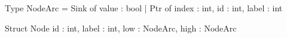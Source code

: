 \begin{blstlisting}[language=pseudo, numbers=none]
  Type NodeArc = Sink of { value : bool }
               | Ptr  of { index : int, id : int, label : int }

  Struct Node {
    id    : int,
    label : int,
    low   : NodeArc,
    high  : NodeArc
  }
\end{blstlisting}
